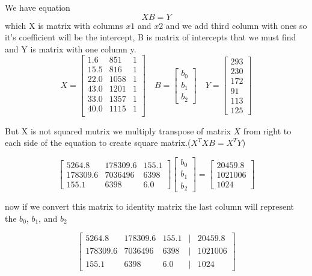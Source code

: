 \documentclass{article}
\begin{document}
	We have equation \[XB=Y\] which X is matrix with columns \(x1\) and \(x2\) and we add third column with ones so it's coefficient will be the intercept, B is matrix of intercepts that we must find and Y is matrix with one column y.
	\[
	X=
	\begin{bmatrix}
		1.6 & 851 & 1 \\
		15.5 & 816 & 1 \\
		22.0 & 1058 & 1 \\
		43.0 & 1201 & 1 \\
		33.0 & 1357 & 1 \\
		40.0 & 1115 & 1 \\
	\end{bmatrix}
	\quad B=
	\begin{bmatrix}
		b_0 \\
		b_1 \\
		b_2
	\end{bmatrix} \quad Y=
	\begin{bmatrix}
		293 \\
		230 \\
		172 \\
		91 \\
		113 \\
		125 
	\end{bmatrix}
	\]
	
	But X is not squared mutrix we multiply transpose of matrix \(X\) from right to each side of the equation to create square matrix.(\(X^T X B = X^T Y\))
	
	\[
	\begin{bmatrix}
		5264.8 & 178309.6 & 155.1 \\
		178309.6 & 7036496 & 6398 \\
		155.1 & 6398 & 6.0
	\end{bmatrix}
	\begin{bmatrix}
		b_0 \\
		b_1 \\
		b_2
	\end{bmatrix} =
	\begin{bmatrix}
		20459.8 \\
		1021006 \\
		1024 
	\end{bmatrix}
	\]
	
	now if we convert this matrix to identity matrix the last column will represent the \( b_0 \), \( b_1 \), and \( b_2 \)
	
	
	\[
	\begin{bmatrix}
		5264.8 & 178309.6 & 155.1 & \vert & 20459.8 \\
		178309.6 & 7036496 & 6398 & \vert & 1021006 \\
		155.1 & 6398 & 6.0 & \vert & 1024
	\end{bmatrix}
	\]
	
\end{document}
